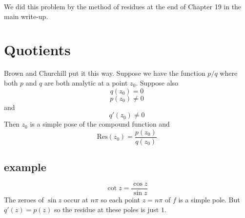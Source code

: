 \documentclass[11pt, oneside]{article}   	%
\begin{document}
We did this problem by the method of residues at the end of Chapter 19 in the main write-up.

\section*{Quotients}
Brown and Churchill put it this way.  Suppose we have the function $p/q$ where both $p$ and $q$ are both analytic at a point $z_0$. Suppose also
\[ q(z_0) = 0 \]
\[ p(z_0) \ne 0 \]
and
\[ q'(z_0) \ne 0 \]
Then $z_0$ is a simple pose of the compound function and
\[ \text{Res} (z_0) = \frac{p(z_0)}{q(z_0)} \]

\subsection*{example}
\[ \cot z = \frac{\cos z}{\sin z} \]
The zeroes of $\sin z$ occur at $n \pi$ so each point $z = n \pi$ of $f$ is a simple pole.  But $q'(z) = p(z)$ so the residue at these poles is just $1$.
\end{document}
